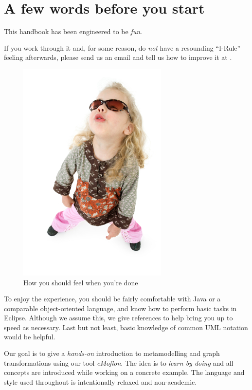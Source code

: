 \genHeader
\newpage


\section*{A few words before you start}

This handbook has been engineered to be \emph{fun}.

If you work through it and, for some reason, do \emph{not} have a resounding \mbox{\enquote{I-Rule}} feeling afterwards, please send us an email and tell us how to improve it at \eMoflonContact.

\begin{figure}[htp]
\begin{center}
	\includegraphics[height=0.45\textheight]{../../org.moflon.doc.handbook.00_introduction/introduction_images/i-rule}
	\caption{How you should feel when you're done}
	\label{i-rule}
\end{center}
\end{figure}
\break
 

To enjoy the experience, you should be fairly comfortable with Java or a comparable object-oriented language, and know how to perform basic tasks in Eclipse. 
Although we assume this, we give references to help bring you up to speed as necessary.
Last but not least, basic knowledge of common UML notation would be helpful.

Our goal is to give a \emph{hands-on} introduction to metamodelling and graph transformations using our tool \emph{eMoflon}.
The idea is to \emph{learn by doing} and all concepts are introduced while working on a concrete example.
The language and style used throughout is intentionally relaxed and non-academic.


